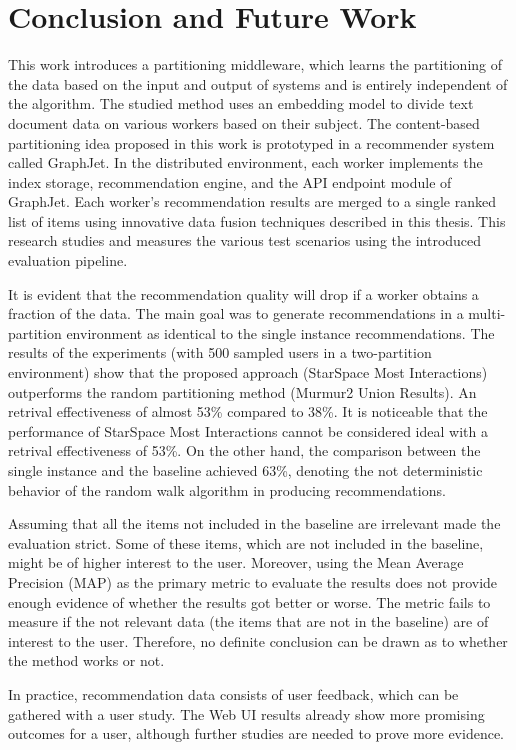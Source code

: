 \chapter{Conclusion and Future Work}
\label{chap:conclusion}
This work introduces a partitioning middleware, which learns the partitioning of the data based on the input and output of systems and is entirely independent of the algorithm. The studied method uses an embedding model to divide text document data on various workers based on their subject. The content-based partitioning idea proposed in this work is prototyped in a recommender system called GraphJet. In the distributed environment, each worker implements the index storage, recommendation engine, and the API endpoint module of GraphJet. Each worker's recommendation results are merged to a single ranked list of items using innovative data fusion techniques described in this thesis. This research studies and measures the various test scenarios using the introduced evaluation pipeline.


It is evident that the recommendation quality will drop if a worker obtains a fraction of the data. The main goal was to generate recommendations in a multi-partition environment as identical to the single instance recommendations. The results of the experiments (with 500 sampled users in a two-partition environment) show that the proposed approach (StarSpace Most Interactions) outperforms the random partitioning method (Murmur2 Union Results). An retrival effectiveness of almost 53\% compared to 38\%. It is noticeable that the performance of StarSpace Most Interactions cannot be considered ideal with a retrival effectiveness of 53\%. On the other hand, the comparison between the single instance and the baseline achieved 63\%, denoting the not deterministic behavior of the random walk algorithm in producing recommendations.


Assuming that all the items not included in the baseline are irrelevant made the evaluation strict. Some of these items, which are not included in the baseline, might be of higher interest to the user. Moreover, using the Mean Average Precision (MAP) as the primary metric to evaluate the results does not provide enough evidence of whether the results got better or worse. The metric fails to measure if the not relevant data (the items that are not in the baseline) are of interest to the user. Therefore, no definite conclusion can be drawn as to whether the method works or not. 


In practice, recommendation data consists of user feedback, which can be gathered with a user study. The Web UI results already show more promising outcomes for a user, although further studies are needed to prove more evidence. 


